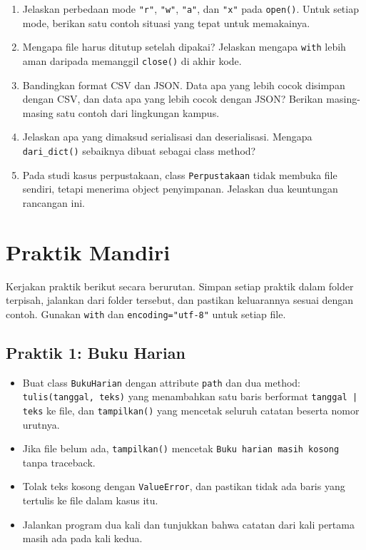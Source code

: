 \begin{enumerate}
  \item Jelaskan perbedaan mode \texttt{"r"}, \texttt{"w"}, \texttt{"a"}, dan \texttt{"x"} pada \texttt{open()}. Untuk setiap mode, berikan satu contoh situasi yang tepat untuk memakainya.
  \item Mengapa file harus ditutup setelah dipakai? Jelaskan mengapa \texttt{with} lebih aman daripada memanggil \texttt{close()} di akhir kode.
  \item Bandingkan format CSV dan JSON. Data apa yang lebih cocok disimpan dengan CSV, dan data apa yang lebih cocok dengan JSON? Berikan masing-masing satu contoh dari lingkungan kampus.
  \item Jelaskan apa yang dimaksud serialisasi dan deserialisasi. Mengapa \texttt{dari\_dict()} sebaiknya dibuat sebagai class method?
  \item Pada studi kasus perpustakaan, class \texttt{Perpustakaan} tidak membuka file sendiri, tetapi menerima object penyimpanan. Jelaskan dua keuntungan rancangan ini.
\end{enumerate}

\section{Praktik Mandiri}

Kerjakan praktik berikut secara berurutan. Simpan setiap praktik dalam folder terpisah, jalankan dari folder tersebut, dan pastikan keluarannya sesuai dengan contoh. Gunakan \texttt{with} dan \texttt{encoding="utf-8"} untuk setiap file.

\subsection{Praktik 1: Buku Harian}

\begin{itemize}
  \item Buat class \texttt{BukuHarian} dengan attribute \texttt{path} dan dua method: \texttt{tulis(tanggal, teks)} yang menambahkan satu baris berformat \texttt{tanggal | teks} ke file, dan \texttt{tampilkan()} yang mencetak seluruh catatan beserta nomor urutnya.
  \item Jika file belum ada, \texttt{tampilkan()} mencetak \texttt{Buku harian masih kosong} tanpa traceback.
  \item Tolak teks kosong dengan \texttt{ValueError}, dan pastikan tidak ada baris yang tertulis ke file dalam kasus itu.
  \item Jalankan program dua kali dan tunjukkan bahwa catatan dari kali pertama masih ada pada kali kedua.
\end{itemize}

